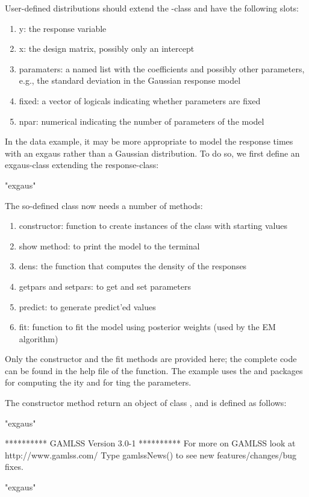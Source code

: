 \documentclass[article]{jss}
\begin{document}
User-defined distributions should extend the -class and
have the following slots:
\begin{enumerate}
	\item y: the response variable
	\item x: the design matrix, possibly only an intercept
	\item paramaters: a named list with the coefficients and possibly 
	other parameters, e.g., the standard deviation in the Gaussian 
	response model
	\item fixed: a vector of logicals indicating whether parameters are 
	fixed
	\item npar: numerical indicating the number of parameters of the model
\end{enumerate}

In the  data example, it may be more appropriate to model
the response times with an exgaus rather than a Gaussian distribution.
To do so, we first define an exgaus-class extending the
response-class:
\begin{Schunk}
\begin{Soutput}
[1] "exgaus"
\end{Soutput}
\end{Schunk}

The so-defined class now needs a number of methods: 
\begin{enumerate}
	\item constructor: function to create instances of the class 
	with starting values
	\item show method: to print the model to the terminal
	\item dens: the function that computes the density of the responses
	\item getpars and setpars: to get and set parameters 
	\item predict: to generate predict'ed values 
	\item fit: function to fit the model using posterior weights (used 
	by the EM algorithm)
\end{enumerate}

Only the constructor and the fit methods are provided here; the
complete code can be found in the help file of the 
function.  The  example uses the  and
 packages
\citep{Stasinopoulos2009a,Stasinopoulos2009b} for computing the
ity and for ting the parameters.

The constructor method return an object of class , and is
defined as follows:
\begin{Schunk}
\begin{Soutput}
[1] "exgaus"
\end{Soutput}
\begin{Soutput}
 **********   GAMLSS Version 3.0-1 ********** 
For more on GAMLSS look at http://www.gamlss.com/ 
Type gamlssNews() to see new features/changes/bug fixes.
\end{Soutput}
\begin{Soutput}
[1] "exgaus"
\end{Soutput}
\end{Schunk}
\end{document}
